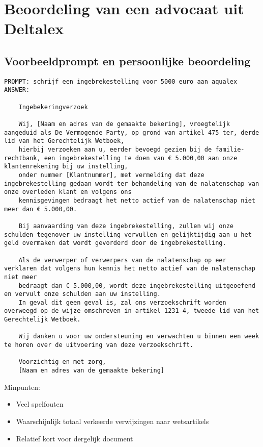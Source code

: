 \section{Beoordeling van een advocaat uit Deltalex}


\subsection{Voorbeeldprompt en persoonlijke beoordeling}
\begin{lstlisting}
PROMPT: schrijf een ingebrekestelling voor 5000 euro aan aqualex
ANSWER:

	Ingebekeringverzoek

	Wij, [Naam en adres van de gemaakte bekering], vroegtelijk aangeduid als De Vermogende Party, op grond van artikel 475 ter, derde lid van het Gerechtelijk Wetboek, 
	hierbij verzoeken aan u, eerder bevoegd gezien bij de familie- rechtbank, een ingebrekestelling te doen van € 5.000,00 aan onze klantenrekening bij uw instelling, 
	onder nummer [Klantnummer], met vermelding dat deze ingebrekestelling gedaan wordt ter behandeling van de nalatenschap van onze overleden klant en volgens ons 
	kennisgevingen bedraagt het netto actief van de nalatenschap niet meer dan € 5.000,00.

	Bij aanvaarding van deze ingebrekestelling, zullen wij onze schulden tegenover uw instelling vervullen en gelijktijdig aan u het geld overmaken dat wordt gevorderd door de ingebrekestelling.

	Als de verwerper of verwerpers van de nalatenschap op eer verklaren dat volgens hun kennis het netto actief van de nalatenschap niet meer 
	bedraagt dan € 5.000,00, wordt deze ingebrekestelling uitgeoefend en vervult onze schulden aan uw instelling. 
	In geval dit geen geval is, zal ons verzoekschrift worden overweegd op de wijze omschreven in artikel 1231-4, tweede lid van het Gerechtelijk Wetboek.

	Wij danken u voor uw ondersteuning en verwachten u binnen een week te horen over de uitvoering van deze verzoekschrift.

	Voorzichtig en met zorg,
	[Naam en adres van de gemaakte bekering]
\end{lstlisting}

Minpunten:
\begin {itemize}
	\item Veel spelfouten
	\item Waarschijnlijk totaal verkeerde verwijzingen naar wetsartikels
	\item Relatief kort voor dergelijk document
\end{itemize}

